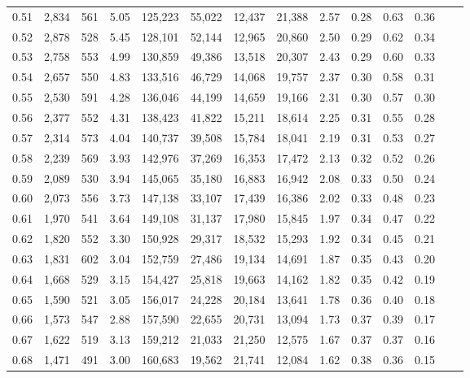 \begin{tabular}{rrrrrrrrrrrrrr}
0.51 &  2,834 &  561 &    5.05 &  125,223 &   55,022 &  12,437 &  21,388 &  2.57 &  0.28 &  0.63 &      0.36 \\
0.52 &  2,878 &  528 &    5.45 &  128,101 &   52,144 &  12,965 &  20,860 &  2.50 &  0.29 &  0.62 &      0.34 \\
0.53 &  2,758 &  553 &    4.99 &  130,859 &   49,386 &  13,518 &  20,307 &  2.43 &  0.29 &  0.60 &      0.33 \\
0.54 &  2,657 &  550 &    4.83 &  133,516 &   46,729 &  14,068 &  19,757 &  2.37 &  0.30 &  0.58 &      0.31 \\
0.55 &  2,530 &  591 &    4.28 &  136,046 &   44,199 &  14,659 &  19,166 &  2.31 &  0.30 &  0.57 &      0.30 \\
0.56 &  2,377 &  552 &    4.31 &  138,423 &   41,822 &  15,211 &  18,614 &  2.25 &  0.31 &  0.55 &      0.28 \\
0.57 &  2,314 &  573 &    4.04 &  140,737 &   39,508 &  15,784 &  18,041 &  2.19 &  0.31 &  0.53 &      0.27 \\
0.58 &  2,239 &  569 &    3.93 &  142,976 &   37,269 &  16,353 &  17,472 &  2.13 &  0.32 &  0.52 &      0.26 \\
0.59 &  2,089 &  530 &    3.94 &  145,065 &   35,180 &  16,883 &  16,942 &  2.08 &  0.33 &  0.50 &      0.24 \\
0.60 &  2,073 &  556 &    3.73 &  147,138 &   33,107 &  17,439 &  16,386 &  2.02 &  0.33 &  0.48 &      0.23 \\
0.61 &  1,970 &  541 &    3.64 &  149,108 &   31,137 &  17,980 &  15,845 &  1.97 &  0.34 &  0.47 &      0.22 \\
0.62 &  1,820 &  552 &    3.30 &  150,928 &   29,317 &  18,532 &  15,293 &  1.92 &  0.34 &  0.45 &      0.21 \\
0.63 &  1,831 &  602 &    3.04 &  152,759 &   27,486 &  19,134 &  14,691 &  1.87 &  0.35 &  0.43 &      0.20 \\
0.64 &  1,668 &  529 &    3.15 &  154,427 &   25,818 &  19,663 &  14,162 &  1.82 &  0.35 &  0.42 &      0.19 \\
0.65 &  1,590 &  521 &    3.05 &  156,017 &   24,228 &  20,184 &  13,641 &  1.78 &  0.36 &  0.40 &      0.18 \\
0.66 &  1,573 &  547 &    2.88 &  157,590 &   22,655 &  20,731 &  13,094 &  1.73 &  0.37 &  0.39 &      0.17 \\
0.67 &  1,622 &  519 &    3.13 &  159,212 &   21,033 &  21,250 &  12,575 &  1.67 &  0.37 &  0.37 &      0.16 \\
0.68 &  1,471 &  491 &    3.00 &  160,683 &   19,562 &  21,741 &  12,084 &  1.62 &  0.38 &  0.36 &      0.15 \\

\end{tabular}
